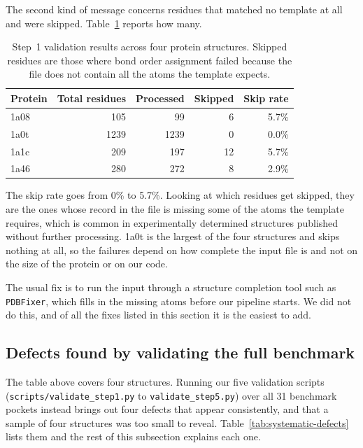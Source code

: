 The second kind of message concerns residues that matched no template at all and were
skipped. Table~\ref{tab:step1-validation} reports how many.

\begin{table}[h]
\centering
\caption{Step~1 validation results across four protein structures. Skipped residues are
those where bond order assignment failed because the file does not contain all the atoms
the template expects.}
\label{tab:step1-validation}
\begin{tabular}{lrrrr}
\toprule
\textbf{Protein} & \textbf{Total residues} & \textbf{Processed} &
\textbf{Skipped} & \textbf{Skip rate} \\
\midrule
1a08 & 105  & 99   & 6  & 5.7\% \\
1a0t & 1239 & 1239 & 0  & 0.0\% \\
1a1c & 209  & 197  & 12 & 5.7\% \\
1a46 & 280  & 272  & 8  & 2.9\% \\
\bottomrule
\end{tabular}
\end{table}

The skip rate goes from 0\% to 5.7\%. Looking at which residues get skipped, they are the
ones whose record in the file is missing some of the atoms the template requires, which
is common in experimentally determined structures published without further processing.
1a0t is the largest of the four structures and skips nothing at all, so the failures
depend on how complete the input file is and not on the size of the protein or on our
code.

The usual fix is to run the input through a structure completion tool such as
\texttt{PDBFixer}, which fills in the missing atoms before our pipeline starts. We did
not do this, and of all the fixes listed in this section it is the easiest to add.

\subsection*{Defects found by validating the full benchmark}

The table above covers four structures. Running our five validation scripts
(\texttt{scripts/validate\_step1.py} to \texttt{validate\_step5.py}) over all 31 benchmark
pockets instead brings out four defects that appear consistently, and that a sample of
four structures was too small to reveal. Table~\ref{tab:systematic-defects} lists them and
the rest of this subsection explains each one.

